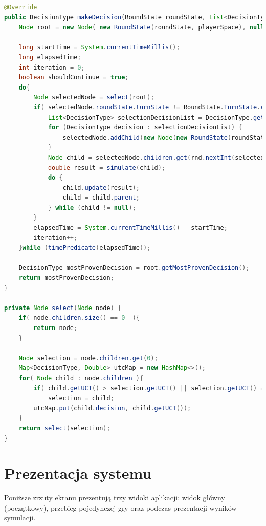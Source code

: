 \begin{lstlisting}[language=java,label=lst:mcts,caption=Wybrane metody klasy MctsAlgorithm, breaklines=true]
@Override
public DecisionType makeDecision(RoundState roundState, List<DecisionType> decisionList) {
	Node root = new Node( new RoundState(roundState, playerSpace), null );
	
	long startTime = System.currentTimeMillis();
	long elapsedTime;
	int iteration = 0;
	boolean shouldContinue = true;
	do{
		Node selectedNode = select(root);
		if( selectedNode.roundState.turnState != RoundState.TurnState.ended ) {
			List<DecisionType> selectionDecisionList = DecisionType.getDecisions(selectedNode.roundState.spaceOfFirstPlayer.hand);
			for (DecisionType decision : selectionDecisionList) {
				selectedNode.addChild(new Node(new RoundState(roundState, roundState.spaceOfFirstPlayer), decision));
			}
			Node child = selectedNode.children.get(rnd.nextInt(selectedNode.children.size()));
			double result = simulate(child);
			do {
				child.update(result);
				child = child.parent;
			} while (child != null);
		}
		elapsedTime = System.currentTimeMillis() - startTime;
		iteration++;
	}while (timePredicate(elapsedTime));
	
	DecisionType mostProvenDecision = root.getMostProvenDecision();
	return mostProvenDecision;
}
    
private Node select(Node node) {
	if( node.children.size() == 0  ){
		return node;
	}
	
	Node selection = node.children.get(0);
	Map<DecisionType, Double> utcMap = new HashMap<>();
	for( Node child : node.children ){
		if( child.getUCT() > selection.getUCT() || selection.getUCT() == 0 )
			selection = child;
		utcMap.put(child.decision, child.getUCT());
	}
	return select(selection);
}

\end{lstlisting}
\clearpage

\section{Prezentacja systemu}
Poniższe zrzuty ekranu prezentują trzy widoki aplikacji: widok główny (początkowy), przebieg pojedynczej gry oraz podczas prezentacji wyników symulacji.
